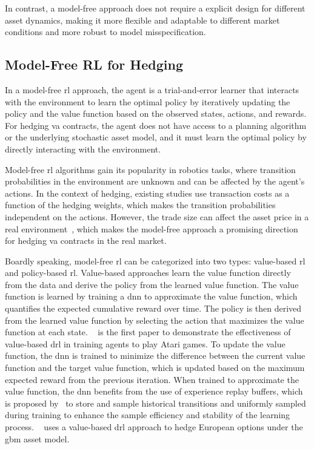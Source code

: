 In contrast, a model-free approach does not require a explicit design for different asset dynamics, making it more flexible and adaptable to different market conditions and more robust to model misspecification.

\subsection{Model-Free RL for Hedging}
    
In a model-free \gls{rl} approach, the agent is a trial-and-error learner that interacts with the environment to learn the optimal policy by iteratively updating the policy and the value function based on the observed states, actions, and rewards.
For hedging \gls{va} contracts, the agent does not have access to a planning algorithm or the underlying stochastic asset model, and it must learn the optimal policy by directly interacting with the environment.

Model-free \gls{rl} algorithms gain its popularity in robotics tasks, where transition probabilities in the environment are unknown and can be affected by the agent's actions.
In the context of hedging, existing studies use transaction costs as a function of the hedging weights, which makes the transition probabilities independent on the actions.
However, the trade size can affect the asset price in a real environment~\citep{hasbrouck1991measuring}, which makes the model-free approach a promising direction for hedging \gls{va} contracts in the real market.

Boardly speaking, model-free \gls{rl} can be categorized into two types: value-based \gls{rl} and policy-based \gls{rl}.
Value-based approaches learn the value function directly from the data and derive the policy from the learned value function. 
The value function is learned by training a \gls{dnn} to approximate the value function, which quantifies the expected cumulative reward over time. 
The policy is then derived from the learned value function by selecting the action that maximizes the value function at each state. 
~\cite{mnih2015human} is the first paper to demonstrate the effectiveness of value-based \gls{drl} in training agents to play Atari games.
To update the value function, the \gls{dnn} is trained to minimize the difference between the current value function and the target value function, which is updated based on the maximum expected reward from the previous iteration.
When trained to approximate the value function, the \gls{dnn} benefits from the use of experience replay buffers, which is proposed by~\cite{lin1992self} to store and sample historical transitions and uniformly sampled during training to enhance the sample efficiency and stability of the learning process.
~\cite{kolm2019dynamic} uses a value-based \gls{drl} approach to hedge European options under the \gls{gbm} asset model.


